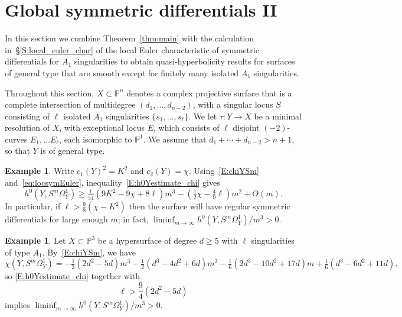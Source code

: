 \documentclass[12pt, reqno]{amsart}
\theoremstyle{definition}
\newtheorem{example}[lemma]{Example}
\newcommand{\PP}{{\mathbb P}}
\numberwithin{equation}{section}
\numberwithin{table}{section}
\begin{document}
\section{Global symmetric differentials II}
\label{S:GlobalSymmetricDifferentials-II}

In this section we combine Theorem~\ref{thm:main} with the calculation in~\S\ref{S:local_euler_char} of the local Euler characteristic of symmetric differentials for $A_1$ singularities to obtain quasi-hyperbolicity results for surfaces of general type that are smooth except for finitely many isolated $A_1$ singularities.

Throughout this section, $X\subset \PP^n$ denotes a complex projective surface that is a complete intersection of multidegree $(d_1,\ldots,d_{n-2})$, with a singular locus $S$  consisting of $\ell$ isolated $A_1$ singularities $\{s_1,\ldots,s_\ell\}$. We let $\tau\colon Y\to X$ be a minimal resolution of $X$, with exceptional locus $E$, which consists of $\ell$ disjoint $(-2)$-curves $E_1,\dots E_\ell$, each isomorphic to $\PP^1$. We assume that $d_1 + \cdots + d_{n-2} > n+1$, so that $Y$ is of general type.

\begin{example} 
\label{ex:hypersurfaces}
Write $c_1(Y)^2=K^2$ and $c_2(Y)=\chi$.  Using~\eqref{E:chiYSm} and~\eqref{eq:locsymEuler}, inequality~\eqref{E:h0Yestimate_chi} gives
\[h^0(Y,S^m\Omega^1_Y)\geq\tfrac{1}{54}(9K^2-9\chi+8\ell)m^3-(\tfrac{1}{2}\chi-\tfrac{4}{9}\ell)m^2+O(m).\]
In particular, if $\ell > \frac{9}{8}(\chi-K^2)$ then the surface will have regular symmetric differentials for large enough $m$; in fact, $\liminf_{m\to \infty} h^0(Y,S^m\Omega^1_Y)/m^3 > 0$.
\end{example}

\begin{example}
\label{Ex:NodalInP3}
Let $X\subset \PP^3$ be a hypersurface of degree $d\geq 5$ with $\ell$ singularities of type $A_1$. By~\eqref{E:chiYSm}, we have
\[\chi(Y,S^m\Omega^1_Y)=-\tfrac{1}{3}(2d^2-5d)m^3-\tfrac{1}{2}(d^3-4d^2+6d)m^2-\tfrac{1}{6}(2d^3-10d^2+17d)m+\tfrac{1}{6}(d^3-6d^2+11d),\]
so \eqref{E:h0Yestimate_chi} together with \[\ell>\frac{9}{4}(2d^2-5d)\] implies $\liminf_{m\to \infty} h^0(Y,S^m\Omega^1_Y)/m^3 > 0$.
\end{example}
\end{document}
